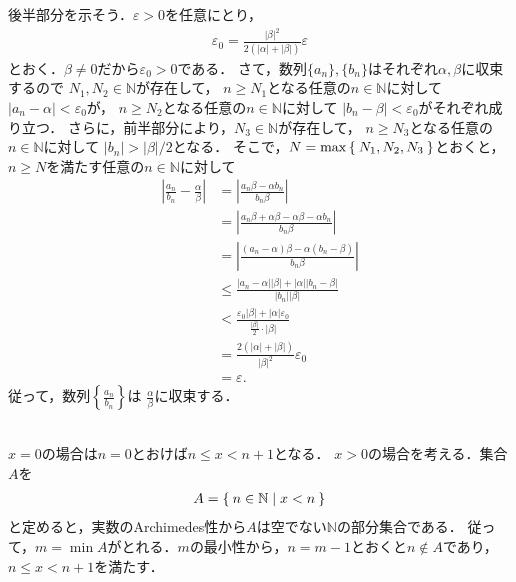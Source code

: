 \begin{description}
  後半部分を示そう．$\varepsilon >0$を任意にとり，
  \begin{align*}
    \varepsilon _0 = \frac{ \lvert \beta \rvert ^2 }
    {2( \lvert \alpha \rvert + \lvert \beta \rvert )} \varepsilon
  \end{align*}
  とおく．$\beta \neq 0$だから$\varepsilon _0 >0$である．
  さて，数列$\{ a_n \} ,  \{ b_n \}$はそれぞれ$\alpha ,  \beta$に収束するので
  $N_1 ,  N_2 \in \mathbb{N}$が存在して，
  $n \geq N_1$となる任意の$n \in \mathbb{N}$に対して
  $\lvert a_n - \alpha \rvert < \varepsilon _0$が，
  $n \geq N_2$となる任意の$n \in \mathbb{N}$に対して
  $ \lvert b_n - \beta \rvert < \varepsilon_0$がそれぞれ成り立つ．
  さらに，前半部分により，$N_3 \in \mathbb{N}$が存在して，
  $n \geq N_3$となる任意の$n \in \mathbb{N}$に対して
  $\lvert b_n \rvert > \lvert \beta \rvert /2$となる．
  そこで，$N = \max \Set{ N_1 ,  N_2 ,  N_3 }$とおくと，
  $n \geq N$を満たす任意の$n \in \mathbb{N}$に対して
  \begin{align*}
    \left \lvert \frac{a_n}{b_n} - \frac{ \alpha }{\beta} \right \rvert 
    & = \left \lvert \frac{ a_n \beta - \alpha b_n}{b_n \beta} \right \rvert \\
    & = \left \lvert \frac{ a_n \beta + \alpha \beta - \alpha \beta - \alpha b_n}
    {b_n \beta} \right \rvert \\
    & = \left \lvert \frac{ (a_n - \alpha ) \beta - \alpha ( b_n - \beta ) }{b_n \beta }
    \right \rvert \\
    & \leq \frac{ \lvert a_n - \alpha \rvert \lvert \beta \rvert + \lvert \alpha \rvert
    \lvert b_n - \beta \rvert }{\lvert b_n \rvert \lvert \beta \rvert } \\
    & < \frac{ \varepsilon _0 \lvert \beta \rvert + \lvert \alpha \rvert \varepsilon _0}
    { \displaystyle \frac{ \lvert \beta \rvert }{2} \cdot \lvert \beta \rvert } \\
    & = \frac{ 2( \lvert \alpha \rvert + \lvert \beta \rvert )}{\lvert \beta \rvert ^2}
    \varepsilon _0 \\
    & = \varepsilon .
  \end{align*}
  従って，数列$\left \{ \displaystyle \frac{a_n}{b_n} \right \}$は
  $\displaystyle \frac{\alpha }{\beta}$に収束する．
\item[\refque{que:gausskigou}] \mbox{} \\
  $x=0$の場合は$n=0$とおけば$n \leq x < n+1$となる．
  $x>0$の場合を考える．集合$A$を
  \begin{align*}
    A = \Set{ n \in \mathbb{N} \mid x < n }
  \end{align*}
  と定めると，実数のArchimedes性から$A$は空でない$\mathbb{N}$の部分集合である．
  従って，$m= \min A$がとれる．$m$の最小性から，$n=m-1$とおくと$n \notin A$であり，
  $n \leq x <n+1$を満たす．


\end{description}
